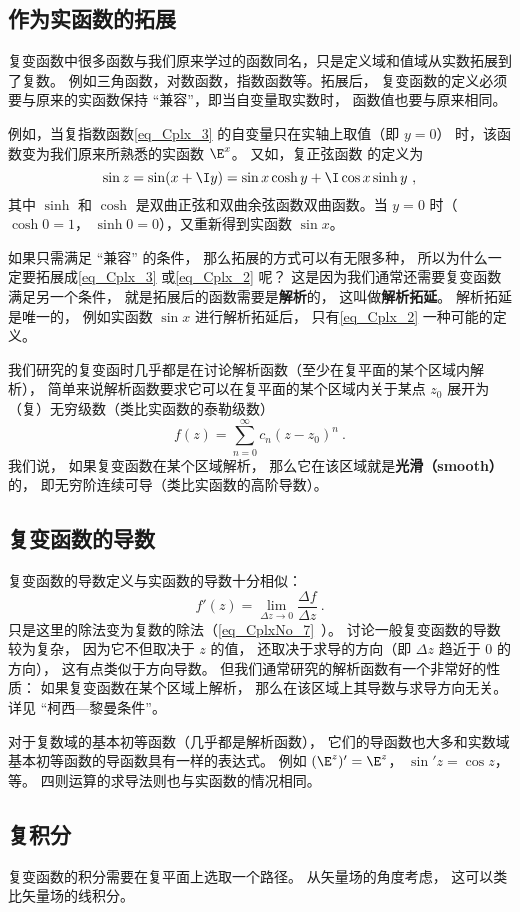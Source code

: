\subsection{作为实函数的拓展}
复变函数中很多函数与我们原来学过的函数同名，只是定义域和值域从实数拓展到了复数。 例如三角函数，对数函数，指数函数等。拓展后， 复变函数的定义必须要与原来的实函数保持 “兼容”，即当自变量取实数时， 函数值也要与原来相同。

例如，当复指数函数\autoref{eq_Cplx_3} 的自变量只在实轴上取值（即 $y = 0$） 时，该函数变为我们原来所熟悉的实函数 $\E^x$。  又如，复正弦函数 的定义为
\begin{equation}\label{eq_Cplx_2}
\sin z = \sin(x + \I y) = \sin x\cosh y + \I\cos x\sinh y~,
\end{equation}
其中 $\sinh $ 和 $\cosh $ 是双曲正弦和双曲余弦函数双曲函数。当 $y = 0$ 时（$\cosh 0 = 1$， $\sinh 0 = 0$），又重新得到实函数 $\sin x$。

如果只需满足 “兼容” 的条件， 那么拓展的方式可以有无限多种， 所以为什么一定要拓展成\autoref{eq_Cplx_3} 或\autoref{eq_Cplx_2} 呢？ 这是因为我们通常还需要复变函数满足另一个条件， 就是拓展后的函数需要是\textbf{解析}的， 这叫做\textbf{解析拓延}。 %
解析拓延是唯一的， 例如实函数 $\sin x$ 进行解析拓延后， 只有\autoref{eq_Cplx_2} 一种可能的定义。

我们研究的复变函时几乎都是在讨论解析函数（至少在复平面的某个区域内解析）， 简单来说解析函数要求它可以在复平面的某个区域内关于某点 $z_0$ 展开为（复）无穷级数（类比实函数的泰勒级数）
\begin{equation}
f(z) = \sum_{n=0}^\infty c_n (z - z_0)^n~.
\end{equation}
我们说， 如果复变函数在某个区域解析， 那么它在该区域就是\textbf{光滑（smooth）}的， 即无穷阶连续可导（类比实函数的高阶导数）。

\subsection{复变函数的导数}
复变函数的导数定义与实函数的导数十分相似：
\begin{equation}
f'(z) = \lim_{\Delta z \to 0} \frac{\Delta f}{\Delta z}~.
\end{equation}
只是这里的除法变为复数的除法（\autoref{eq_CplxNo_7}~）。 讨论一般复变函数的导数较为复杂， 因为它不但取决于 $z$ 的值， 还取决于求导的方向（即 $\Delta z$ 趋近于 $0$ 的方向）， 这有点类似于方向导数。 但我们通常研究的解析函数有一个非常好的性质： 如果复变函数在某个区域上解析， 那么在该区域上其导数与求导方向无关。 详见 “柯西—黎曼条件”。

对于复数域的基本初等函数（几乎都是解析函数）， 它们的导函数也大多和实数域基本初等函数的导函数具有一样的表达式。 例如 $(\E^z)' = \E^z$， $\sin' z = \cos z$， 等。 四则运算的求导法则也与实函数的情况相同。

\subsection{复积分}
复变函数的积分需要在复平面上选取一个路径。 从矢量场的角度考虑， 这可以类比矢量场的线积分。
